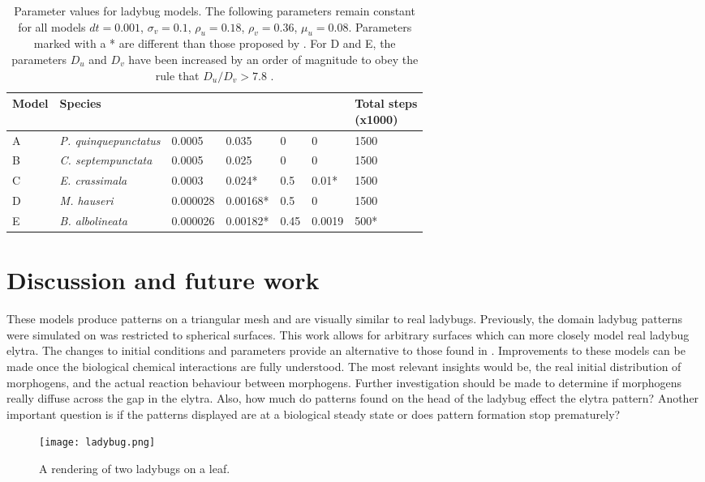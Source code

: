 \begin{table}[p]
	\centering
	\begin{tabular}{|l|l|l|l|l|l|l|}
	\hline
	\textbf{Model} & \textbf{Species} &\bm{$D_u$} &\bm{$D_v$} &\bm{$\kappa$} & \bm{$\sigma_u$} &\thead{\textbf{Total steps} \\ \textbf{(x1000)}}\\ \hline 
	A     &\textit{P. quinquepunctatus}&0.0005  &0.035    &0        &0          & 1500              \\ \hline
	B     &\textit{C. septempunctata}  &0.0005  &0.025    &0        &0          & 1500              \\ \hline
	C     &\textit{E. crassimala}      &0.0003  &0.024*   &0.5      &0.01*      & 1500              \\ \hline
	D     &\textit{M. hauseri}         &0.000028&0.00168* &0.5      &0          & 1500              \\ \hline
	E     &\textit{B. albolineata}     &0.000026&0.00182* &0.45     &0.0019     & 500*              \\
	\hline
	\end{tabular}
	\caption {Parameter values for ladybug models. The following parameters remain constant for all models $dt = 0.001$, $\sigma_v= 0.1$, $\rho_u = 0.18$, $\rho_v = 0.36$, $\mu_u = 0.08$. Parameters marked with a * are different than those proposed by \citet{Liaw2001}. For D and E, the parameters $D_u$ and $D_v$ have been increased by an order of magnitude to obey the rule that $D_u / D_v > 7.8$ \citep{Liaw2001}.}
	\label{tab:ladyBugParameters}
\end{table}

\section{Discussion and future work}
These models produce patterns on a triangular mesh and are visually similar to real ladybugs. Previously, the domain ladybug patterns were simulated on was restricted to spherical surfaces. This work allows for arbitrary surfaces which can more closely model real ladybug elytra. The changes to initial conditions and parameters provide an alternative to those found in \citep{Liaw2001}. Improvements to these models can be made once the biological chemical interactions are fully understood. The most relevant insights would be, the real initial distribution of morphogens, and the actual reaction behaviour between morphogens. Further investigation should be made to determine if morphogens really diffuse across the gap in the elytra. Also, how much do patterns found on the head of the ladybug effect the elytra pattern? Another important question is if the patterns displayed are at a biological steady state or does pattern formation stop prematurely?

\begin{figure}[p]
	\centering
	\texttt{[image: ladybug.png]}
	\caption{A rendering of two ladybugs on a leaf.}
	\label{fig:ladybugRender}
\end{figure}